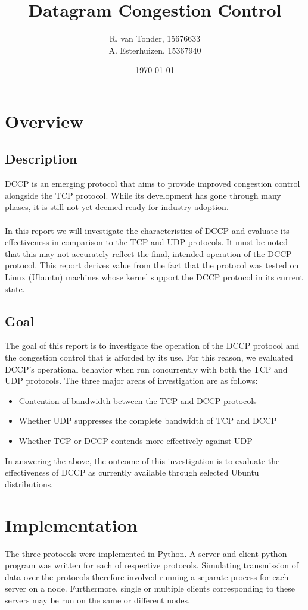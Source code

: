 \documentclass[10pt,a4paper]{article}
\title{Datagram Congestion Control}
\author{R. van Tonder, 15676633 \\ A. Esterhuizen, 15367940}
\date{\today}
\begin{document}
\maketitle
\newpage

\section{Overview}
\subsection{Description}
DCCP is an emerging protocol that aims to provide improved congestion control
alongside the TCP protocol. While its development has gone through many
phases, it is still not yet deemed ready for industry adoption. 
\paragraph{}
In this report we will investigate the characteristics of DCCP and evaluate its
effectiveness in comparison to the TCP and UDP protocols. It must be noted that
this may not accurately reflect the final, intended operation of the DCCP
protocol. This report derives value from the fact that the protocol was tested
on Linux (Ubuntu) machines whose kernel support the DCCP protocol in
its current state.

\subsection{Goal}
\label{goals}
The goal of this report is to investigate the operation of the DCCP protocol and the congestion control that is afforded
by its use. For this reason, we evaluated DCCP's operational behavior when run concurrently with both the TCP and UDP protocols. 
The three major areas of investigation are as follows:
\begin{itemize}
\item Contention of bandwidth between the TCP and DCCP protocols
\item Whether UDP suppresses the complete bandwidth of TCP and DCCP
\item Whether TCP or DCCP contends more effectively against UDP
\end{itemize}
In answering the above, the outcome of this investigation is to evaluate the effectiveness of DCCP as currently available through 
selected Ubuntu distributions. 


\section{Implementation}
The three protocols were implemented in Python. A server and client python program was written for each
of respective protocols. Simulating transmission of data over the protocols therefore involved running a
separate process for each server on a node. Furthermore, single or multiple clients corresponding to these
servers may be run on the same or different nodes.
\end{document}
